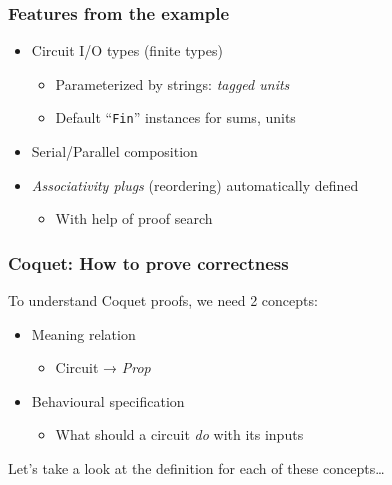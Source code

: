         \begin{frame}
            \frametitle{Features from the example}
            
            \begin{itemize}
                \item Circuit I/O types (finite types)
                    \begin{itemize}
                        \item Parameterized by strings: \emph{tagged units}
                        \item Default ``\texttt{Fin}'' instances for sums, units
                    \end{itemize}
                \item Serial/Parallel composition
                \item \emph{Associativity plugs} (reordering) automatically defined
                    \begin{itemize}
                        \item With help of proof search
                    \end{itemize}
            \end{itemize}
        \end{frame}

        \begin{frame}
            \frametitle{Coquet: How to prove correctness}

            \par{To understand Coquet proofs, we need 2 concepts:}
            \begin{itemize}
                \item Meaning relation
                    \begin{itemize}
                        \item Circuit → \emph{Prop}
                    \end{itemize}
                \item Behavioural specification
                    \begin{itemize}
                        \item What should a circuit \emph{do} with its inputs
                    \end{itemize}
            \end{itemize}
            \vspace{0.5cm}
            \par{Let's take a look at the definition for each of these concepts\ldots}
        \end{frame}

